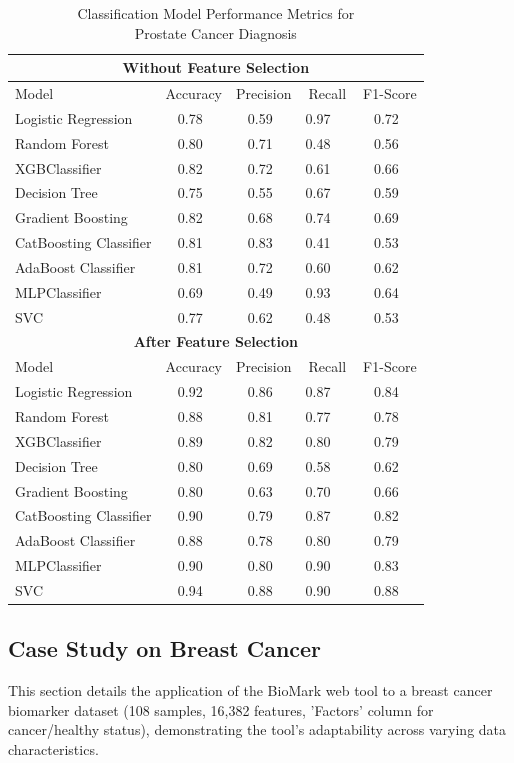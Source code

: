 \documentclass[journal]{IEEEtran}
\begin{document}
\begin{table}[h]
\centering
\caption{Classification Model Performance Metrics for \\Prostate Cancer Diagnosis} 
\label{tab:all_models_comparison_grouped_v2}
\begin{tabular}{lcccc}
\toprule
\multicolumn{5}{c}{\textbf{Without Feature Selection}} \\
\midrule
Model  & Accuracy & Precision & Recall & F1-Score \\
\midrule
Logistic Regression& 0.78 & 0.59  & 0.97   & 0.72 \\
Random Forest  & 0.80 & 0.71  & 0.48   & 0.56 \\
XGBClassifier  & 0.82 & 0.72  & 0.61   & 0.66 \\
Decision Tree  & 0.75 & 0.55  & 0.67   & 0.59 \\
Gradient Boosting  & 0.82 & 0.68  & 0.74   & 0.69 \\
CatBoosting Classifier & 0.81 & 0.83  & 0.41   & 0.53 \\
AdaBoost Classifier& 0.81 & 0.72  & 0.60   & 0.62 \\
MLPClassifier  & 0.69 & 0.49  & 0.93   & 0.64 \\
SVC& 0.77 & 0.62  & 0.48   & 0.53 \\
\midrule
\multicolumn{5}{c}{\textbf{After Feature Selection}} \\
\midrule
Model  & Accuracy & Precision & Recall & F1-Score \\
\midrule
Logistic Regression& 0.92 & 0.86  & 0.87   & 0.84 \\
Random Forest  & 0.88 & 0.81  & 0.77   & 0.78 \\
XGBClassifier  & 0.89 & 0.82  & 0.80   & 0.79 \\
Decision Tree  & 0.80 & 0.69  & 0.58   & 0.62 \\
Gradient Boosting  & 0.80 & 0.63  & 0.70   & 0.66 \\
CatBoosting Classifier & 0.90 & 0.79  & 0.87   & 0.82 \\
AdaBoost Classifier& 0.88 & 0.78  & 0.80   & 0.79 \\
MLPClassifier  & 0.90 & 0.80  & 0.90   & 0.83 \\
SVC& 0.94 & 0.88  & 0.90   & 0.88 \\
\bottomrule
\end{tabular}
\end{table}

\subsection{Case Study on Breast Cancer}
This section details the application of the BioMark web tool to a breast cancer biomarker dataset (108 samples, 16,382 features, 'Factors' column for cancer/healthy status), demonstrating the tool's adaptability across varying data characteristics.
\end{document}
